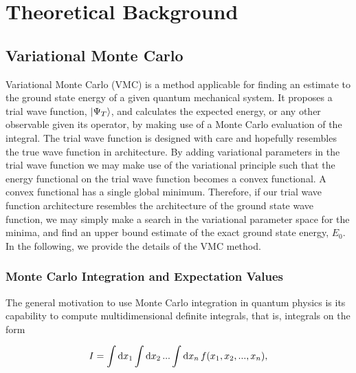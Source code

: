 \section{Theoretical Background}\label{sec:Theory}

\subsection{Variational Monte Carlo}

Variational Monte Carlo (VMC) is a method applicable for finding an estimate to the ground state energy of a given quantum mechanical system. It proposes a trial wave function, $\ket{\Psi_T}$, and calculates the expected energy, or any other observable given its operator, by making use of a Monte Carlo evaluation of the integral. The trial wave function is designed with care and hopefully resembles the true wave function in architecture. By adding variational parameters in the trial wave function we may make use of the variational principle such that the energy functional on the trial wave function becomes a convex functional. A convex functional has a single global minimum. Therefore, if our trial wave function architecture resembles the architecture of the ground state wave function, we may simply make a search in the variational parameter space for the minima, and find an upper bound estimate of the exact ground state energy, $E_0$. In the following, we provide the details of the VMC method. 

\subsubsection{Monte Carlo Integration and Expectation Values}\label{sec:mc_integration}

The general motivation to use Monte Carlo integration in quantum physics is its capability to compute multidimensional definite integrals, that is, integrals on the form 

\begin{equation*}
    I = \int \dd{x_1} \int \dd{x_2} ... \int \dd{x_n} f \qty(x_1, x_2, ..., x_n),
\end{equation*}


